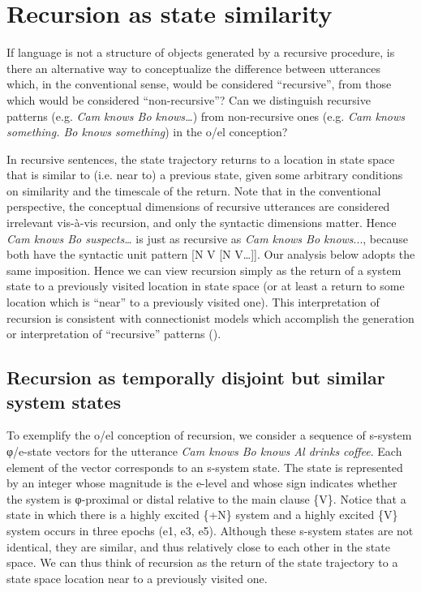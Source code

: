 \section{Recursion as state similarity}

If language is not a structure of objects generated by a recursive procedure, is there an alternative way to conceptualize the difference between utterances which, in the conventional sense, would be considered “recursive”, from those which would be considered “non-recursive”? Can we distinguish recursive patterns (e.g. \textit{Cam knows Bo knows…}) from non-recursive ones (e.g. \textit{Cam knows something. Bo knows something}) in the o/el conception? 

  In recursive sentences, the state trajectory returns to a location in state space that is similar to (i.e. near to) a previous state, given some arbitrary conditions on similarity and the timescale of the return. Note that in the conventional perspective, the conceptual dimensions of recursive utterances are considered irrelevant vis-à-vis recursion, and only the syntactic dimensions matter. Hence \textit{Cam knows Bo suspects…} is just as recursive as \textit{Cam knows Bo knows}..., because both have the syntactic unit pattern [N V [N V…]]. Our analysis below adopts the same imposition. Hence we can view recursion simply as the return of a system state to a previously visited location in state space (or at least a return to some location which is “near” to a previously visited one). This interpretation of recursion is consistent with connectionist models which accomplish the generation or interpretation of “recursive” patterns (\citealt{ChristiansenChater1999,Elman1989,Smolensky1990}).

\subsection{Recursion as temporally disjoint but similar system states}

To exemplify the o/el conception of recursion, we consider a sequence of s-system φ/e-state vectors for the utterance \textit{Cam knows Bo knows Al drinks coffee}. Each element of the vector corresponds to an s-system state. The state is represented by an integer whose magnitude is the e-level and whose sign indicates whether the system is φ-proximal or distal relative to the main clause \{V\}. Notice that a state in which there is a highly excited \{+N\} system and a highly excited \{V\} system occurs in three epochs (e1, e3, e5). Although these s-system states are not identical, they are similar, and thus relatively close to each other in the state space. We can thus think of recursion as the return of the state trajectory to a state space location near to a previously visited one.

